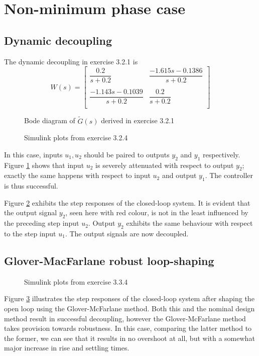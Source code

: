 \documentclass[a4paper,12pt,oneside,onecolumn]{article} %
\newcommand{\imaget}[3][width=1.0\columnwidth]{
	\begin{figure}[H]
		\centering
      
		\caption{#3}
		\label{fig:#2}
	\end{figure}
}
\begin{document}
  \newpage

	\section*{Non-minimum phase case}

	\subsection*{Dynamic decoupling}
	The dynamic decoupling in exercise 3.2.1 is
	\[
		W(s) =
    \begin{bmatrix}
      \dfrac{0.2}{s+0.2}  & \dfrac{-1.615 s - 0.1386}{s + 0.2}  \\\\
      \dfrac{-1.143 s - 0.1039}{s+0.2}  & \dfrac{0.2}{s + 0.2}  \\
    \end{bmatrix}
	\]

	\imaget{figures/bode_nmp.tex}{Bode diagram of $\tilde{G}(s)$ derived in exercise 3.2.1}
	\imaget{figures/response_nmp.tex}{Simulink plots from exercise 3.2.4}

  In this case, inputs $u_1, u_2$ should be paired to outputs $y_2$ and $y_1$
  respectively. Figure \ref{fig:figures/bode_nmp.tex} shows that input $u_2$ is
  severely attenuated with respect to output $y_2$; exactly the same happens with
  respect to input $u_2$ and output $y_1$. The controller is thus successful.

  Figure \ref{fig:figures/response_nmp.tex} exhibits the step responses of the
  closed-loop system. It is evident that the output signal $y_2$, seen here with
  red colour, is not in the least influenced by the preceding step input $u_2$.
  Output $y_2$ exhibits the same behaviour with respect to the step input $u_1$.
  The output signals are now decoupled.


	\subsection*{Glover-MacFarlane robust loop-shaping}

  \imaget{figures/response_nmp_gmcf.tex}{Simulink plots from exercise 3.3.4}

  Figure \ref{fig:figures/response_nmp_gmcf.tex} illustrates the step responses
  of the closed-loop system after shaping the open loop using the Glover-McFarlane
  method. Both this and the nominal design method result in successful decoupling,
  however the Glover-McFarlane method takes provision towards robustness. In
  this case, comparing the latter method to the former, we can see that it
  results in no overshoot at all, but with a somewhat major increase in rise
  and settling times.
\end{document}
